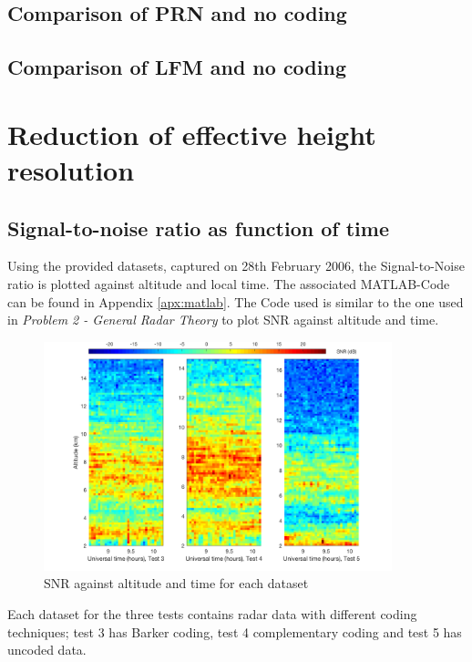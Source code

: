 \subsection{Comparison of PRN and no coding}

\subsection{Comparison of LFM and no coding}


\section{Reduction of effective height resolution}

\subsection{Signal-to-noise ratio as function of time}
Using the provided datasets, captured on 28th February 2006, the Signal-to-Noise ratio is plotted against altitude and local time. The associated MATLAB-Code can be found in Appendix \ref{apx:matlab}. The Code used is similar to the one used in \textit{Problem 2 - General Radar Theory} to plot SNR against altitude and time.

\begin{figure}
	\centering
	\includegraphics[width=0.9\textwidth]{images/task2_snr_plot}
	\caption{SNR against altitude and time for each dataset}
	\label{fig:snr}
\end{figure}

Each dataset for the three tests contains radar data with different coding techniques; test 3 has Barker coding, test 4 complementary coding and test 5 has uncoded data. \newline



